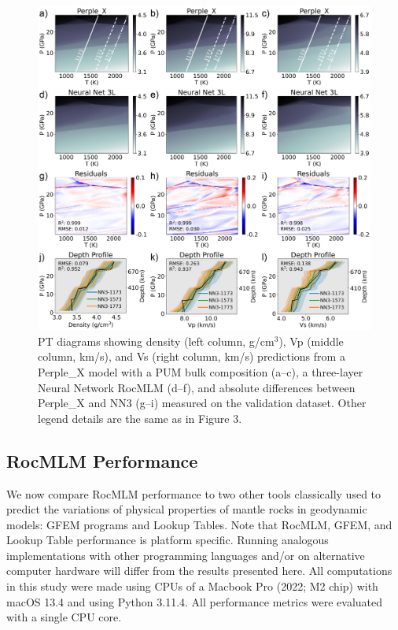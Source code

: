 \documentclass[draft,linenumbers]{agujournal2018}
\begin{document}
\begin{figure}[htbp]

{\centering \includegraphics[width=1\linewidth,]{image12-PUM-NN3} 

}

\caption{PT diagrams showing density (left column, g/cm\(^3\)), Vp (middle column, km/s), and Vs (right column, km/s) predictions from a Perple\_X model with a PUM bulk composition (a--c), a three-layer Neural Network RocMLM (d--f), and absolute differences between Perple\_X and NN3 (g--i) measured on the validation dataset. Other legend details are the same as in Figure 3.}\label{fig:image12-PUM-NN3}
\end{figure}

\subsection{RocMLM Performance}\label{sec:rocmlm-performance-and-efficiency}

We now compare RocMLM performance to two other tools classically used to predict the variations of physical properties of mantle rocks in geodynamic models: GFEM programs and Lookup Tables. Note that RocMLM, GFEM, and Lookup Table performance is platform specific. Running analogous implementations with other programming languages and/or on alternative computer hardware will differ from the results presented here. All computations in this study were made using CPUs of a Macbook Pro (2022; M2 chip) with macOS 13.4 and using Python 3.11.4. All performance metrics were evaluated with a single CPU core.
\end{document}
